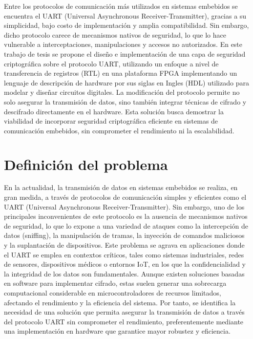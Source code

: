 Entre los protocolos de comunicación más utilizados en sistemas embebidos se encuentra el UART (Universal Asynchronous Receiver-Transmitter), gracias a su simplicidad, bajo costo de implementación y amplia compatibilidad. Sin embargo, dicho protocolo carece de mecanismos nativos de seguridad, lo que lo hace vulnerable a interceptaciones, manipulaciones y accesos no autorizados.
En este trabajo de tesis se propone el diseño e implementación de una capa de seguridad criptográfica sobre el protocolo UART, utilizando un enfoque a nivel de transferencia de registros (RTL) en una plataforma FPGA implementando un lenguaje de descripción de hardware por sus siglas en Ingles (HDL) utilizado para modelar y diseñar circuitos digitales. La modificación del protocolo permite no solo asegurar la transmisión de datos, sino también integrar técnicas de cifrado y descifrado directamente en el hardware. Esta solución busca demostrar la viabilidad de incorporar seguridad criptográfica eficiente en sistemas de comunicación embebidos, sin comprometer el rendimiento ni la escalabilidad.
\\
\section{Definición del problema}
En la actualidad, la transmisión de datos en sistemas embebidos se realiza, en gran medida, a través de protocolos de comunicación simples y eficientes como el UART (Universal Asynchronous Receiver-Transmitter). Sin embargo, uno de los principales inconvenientes de este protocolo es la ausencia de mecanismos nativos de seguridad, lo que lo expone a una variedad de ataques como la intercepción de datos (sniffing), la manipulación de tramas, la inyección de comandos maliciosos y la suplantación de dispositivos.
Este problema se agrava en aplicaciones donde el UART se emplea en contextos críticos, tales como sistemas industriales, redes de sensores, dispositivos médicos o entornos IoT, en los que la confidencialidad y la integridad de los datos son fundamentales. Aunque existen soluciones basadas en software para implementar cifrado, estas suelen generar una sobrecarga computacional considerable en microcontroladores de recursos limitados, afectando el rendimiento y la eficiencia del sistema.
Por tanto, se identifica la necesidad de una solución que permita asegurar la transmisión de datos a través del protocolo UART sin comprometer el rendimiento, preferentemente mediante una implementación en hardware que garantice mayor robustez y eficiencia.
\newpage
